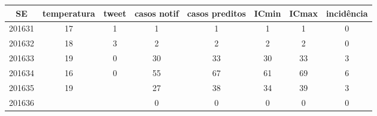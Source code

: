 \begin{tabular}{c|ccccccc}
  \hline
SE & temperatura & tweet & casos notif & casos preditos & ICmin & ICmax & incidência \\ 
  \hline
201631 & 17 & 1 & 1 & 1 & 1 & 1 & 0 \\ 
  201632 & 18 & 3 & 2 & 2 & 2 & 2 & 0 \\ 
  201633 & 19 & 0 & 30 & 33 & 30 & 33 & 3 \\ 
  201634 & 16 & 0 & 55 & 67 & 61 & 69 & 6 \\ 
  201635 & 19 &  & 27 & 38 & 34 & 39 & 3 \\ 
  201636 &  &  & 0 & 0 & 0 & 0 & 0 \\ 
   \hline
\end{tabular}
